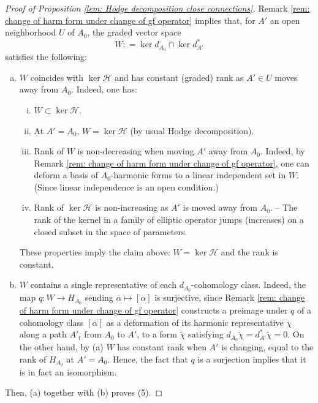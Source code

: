 \documentclass[11pt,a4paper]{amsart}
\theoremstyle{plain} %
\theoremstyle{definition}
\theoremstyle{remark}
\newcommand{\mr}{\mathrm}
\newcommand{\ra}{\rightarrow}
\newcommand{\til}{\widetilde}
\newcommand{\HHH}{\mathcal{H}}
\begin{document}
{\begin{proof}[Proof of Proposition \ref{lem: Hodge decomposition close connections}]
Remark \ref{rem: change of harm form under change of gf operator} implies that, for $A'$ an open neighborhood $U$ of $A_0$, the graded vector space 
\begin{equation}\label{W= space of (A_0,A_1)-harmonic forms}
W\colon=\ker d_{A_0}\cap \ker d^*_{A'}
\end{equation}
satisfies the following:
\begin{enumerate}[(a)]
    \item 
    $W$ coincides with $\ker \HHH$ and has constant (graded) rank as $A'\in U$ moves away from $A_0$. Indeed, one has:
    \begin{enumerate}[(i)]
        \item $W\subset \ker\HHH$.
        \item At $A'=A_0$, $W=\ker\HHH$ (by usual Hodge decomposition).
        \item Rank of $W$ is non-decreasing when moving $A'$ away from $A_0$. %
        Indeed, by Remark \ref{rem: change of harm form under change of gf operator}, one can deform a basis of $A_0$-harmonic forms to a linear independent set in $W$. (Since linear independence is an open condition.)
        \item Rank of $\ker\HHH$ is non-increasing as $A'$ is moved away from $A_0$. -- The rank of the kernel in a family of elliptic operator jumps (increases) on a closed subset in the space of parameters.
    \end{enumerate}
    These properties imply the claim above: $W=\ker\HHH$ and the rank is constant.
    \item $W$ contains a single representative of each $d_{A_0}$-cohomology class. Indeed, the map $q\colon W \ra H_{A_0}$ sending $\alpha\mapsto [\alpha]$ is surjective, since Remark \ref{rem: change of harm form under change of gf operator} 
    constructs a preimage under $q$ of a cohomology class $[\alpha]$ as a deformation of its harmonic representative $\chi$ along a path $A'_t$ from $A_0$ to $A'$, to a form $\til\chi$ satisfying $d_{A_0}\til\chi=d^*_{A'}\til\chi=0$.
    On the other hand, by (a) $W$ has constant rank when $A'$ is changing, equal to the rank of $H_{A_0}$ at $A'=A_0$. Hence, the fact that $q$ is a surjection implies that it is in fact an isomorphism.
\end{enumerate}
Then, (a) together with (b) proves (5).


\end{proof}}
\end{document}
